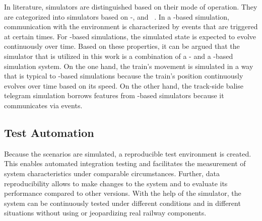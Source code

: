 In literature, simulators are distinguished based on their mode of operation.
They are categorized into simulators based on -, and ~\cite{CoSimulationStateOfTheArt}.
In a -based simulation, communication with the environment is characterized by events that are triggered at certain times.
For -based simulations, the simulated state is expected to evolve continuously over time.
Based on these properties, it can be argued that the simulator that is utilized in this work is a combination of a - and a -based simulation system.
On the one hand, the train's movement is simulated in a way that is typical to -based simulations because the train's position continuously evolves over time based on its speed.
On the other hand, the track-side balise telegram simulation borrows features from -based simulators because it communicates via events.

\subsection{Test Automation}
\label{subsec:testautomation}

Because the scenarios are simulated, a reproducible test environment is created.
This enables automated integration testing and facilitates the measurement of system characteristics under comparable circumstances.
Further, data reproducibility allows to make changes to the system and to evaluate its performance compared to other versions.
With the help of the simulator, the system can be continuously tested under different conditions and in different situations without using or jeopardizing real railway components.
\\

